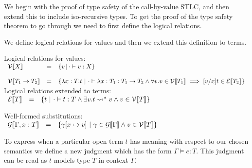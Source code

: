 We begin with the proof of type safety of the call-by-value STLC, and
then extend this to include iso-recursive types.  To get the proof of
the type safety theorem to go through we need to first define the
logical relations.
\begin{definition}
  \label{def:logical_relations}
  We define logical relations for values and then we extend this definition to
  terms.
  
  \noindent
  Logical relations for values: \\
  \begin{math}
    \small
    \begin{array}{lllll}
      \mathcal{V}\interp{X} & = &  \{ v\,|\, \cdot \vdash v : X \} \\
      & \\
      \mathcal{V}\interp{T_1 \to T_2} & = & \{ \lambda x:T.t\ |\ 
      \cdot \vdash \lambda x:T_1 : T_1 \to T_2 \land
      \forall v.v \in \mathcal{V} \interp{T_1} \implies 
              [v/x]t \in \mathcal{E}\interp{T_2} \}\\
    \end{array}
  \end{math}\\
  
  \vspace{-20px}
  \noindent
  Logical relations extended to terms:\\
  \begin{math}
    \begin{array}{lll}
      \mathcal{E}[\negthinspace[T]\negthinspace] & = & \{ t\ |\ \cdot \vdash t:T \land 
      \exists v.t \rightsquigarrow^* v \land v \in \mathcal{V}[\negthinspace[T]\negthinspace] \}
    \end{array}
  \end{math}
  
  \noindent
  Well-formed substitutions:\\
  \begin{math}
    \begin{array}{lllll}
        \mathcal{G}[\negthinspace[\Gamma,x:T]\negthinspace] & = & 
        \{ \gamma[x \mapsto v]\ |\ \gamma \in \mathcal{G}[\negthinspace[\Gamma]\negthinspace] \land 
        v \in \mathcal{V}[\negthinspace[T]\negthinspace] \}
    \end{array}
  \end{math}
\end{definition}
To express when a particular open term $t$ has meaning with respect to our chosen 
semantics we define a new judgment which has the form $\Gamma \models e : T$.
This judgment can be read as $t$ models type $T$ in context $\Gamma$.
